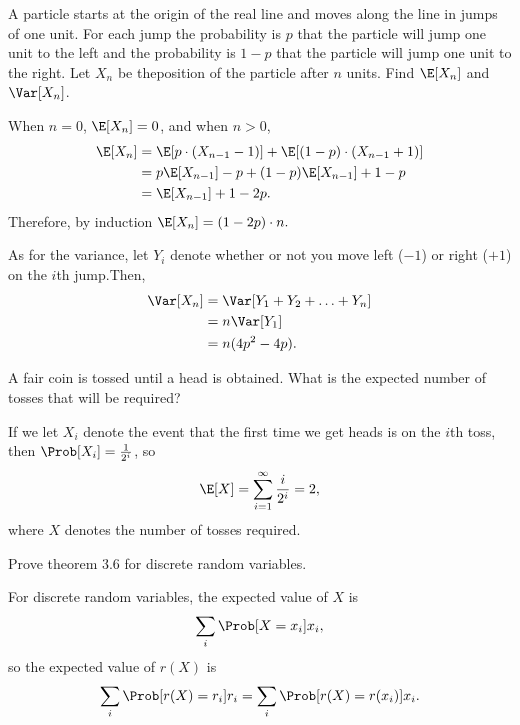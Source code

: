 \documentclass[a4paper]{article}
\begin{document}
\begin{Exercise}
	A particle starts at the origin of the real line and moves along the line in jumps of one unit. For each jump the probability is $p$ that the particle will jump one unit to the left and the probability is $1 - p$ that the particle will jump one unit to the right. Let $X_n$ be theposition of the particle after $n$ units. Find $\E[X_n]$ and $\Var[X_n]$.
\end{Exercise}
\begin{Solution}
	When $n = 0$, $\E[X_n] = 0$, and when $n > 0$,
	\begin{align*}
		\E[X_n] &= \E[p \cdot (X_{n - 1} - 1)] + \E[(1 - p) \cdot (X_{n - 1} + 1)]
		     \\ &= p \E[X_{n - 1}] - p + (1 - p) \E[X_{n - 1}] + 1 - p
		     \\ &= \E[X_{n - 1}] + 1 - 2p.
	\end{align*}
	Therefore, by induction $\E[X_n] = (1 - 2p) \cdot n.$ 

	As for the variance, let $Y_i$ denote whether or not you move left ($-1$) or right ($+1$) on the $i$th jump.Then,
	\begin{align*}
		\Var[X_n] &= \Var[Y_1 + Y_2 + \ldots + Y_n]
		       \\ &= n \Var[Y_1]
		       \\ &= n (4p^2 - 4p).
	\end{align*}
\end{Solution}
\begin{Exercise}
	A fair coin is tossed until a head is obtained. What is the expected number of tosses that will be required?
\end{Exercise}
\begin{Solution}
	If we let $X_i$ denote the event that the first time we get heads is on the $i$th toss, then $\Prob[X_i] = \frac{1}{2^i}$, so
	\begin{align*}
		\E[X] = \sum_{i = 1}^{\infty} \frac{i}{2^i} = 2,
	\end{align*}
	where $X$ denotes the number of tosses required.
\end{Solution}
\begin{Exercise}
	Prove theorem 3.6 for discrete random variables.
\end{Exercise}
\begin{Solution}
	For discrete random variables, the expected value of $X$ is
	\begin{align*}
		\sum_i \Prob[X = x_i] x_i,
	\end{align*}
	so the expected value of $r(X)$ is 
	\begin{align*}
		\sum_i \Prob[r(X) = r_i] r_i = \sum_i \Prob[r(X) = r(x_i)] x_i.
	\end{align*}
\end{Solution}
\end{document}
